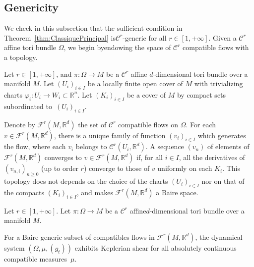 \documentclass[10pt]{amsart}
\theoremstyle{definition}\newtheorem{defi}[theo]{Definition}\newtheorem{rema}[theo]{Remark}\newtheorem{exam}[theo]{Example}\newtheorem{exem}[theo]{Example}\newtheorem{nota}[theo]{Notation}
\newcommand{\R}{\mathbb{R}}
\newcommand{\Ccal}{\mathcal{C}}
\newcommand{\Fcal}{\mathcal{F}}
\begin{document}
\subsection{Genericity}\label{subsec:FlotTM}


We check in this subsection that the sufficient condition in Theorem~\ref{thm:ClassiquePrincipal} is\linebreak$\Ccal^r$-generic for all $r \in [1, +\infty]$. Given a $\Ccal^r$ affine tori bundle $\Omega$, we begin by\linebreak endowing the space of $\Ccal^r$ compatible flows with a topology.


Let $r \in [1, +\infty]$, and $\pi: \Omega \to M$ be a $\Ccal^r$ affine $d$-dimensional tori bundle over a manifold $M$. Let $(U_i)_{i \in I}$ be a locally finite open cover of $M$ with trivializing charts $\varphi_i : U_i \to W_i \subset \R^n$. Let $(K_i)_{i \in I}$ be a cover of $M$ by compact sets subordinated to~$(U_i)_{i \in I}$.


Denote by $\Fcal^r (M, \R^d)$ the set of $\Ccal^r$ compatible flows on $\Omega$. For each $v \in \Fcal^r (M, \R^d)$, there is a unique family of function $(v_i)_{i \in I}$ which generates the flow, where each $v_i$ belongs to $\Ccal^r (U_i,\R^d)$. A sequence $(v_n)$ of elements of $\Fcal^r (M, \R^d)$ converges to $v \in \Fcal^r (M, \R^d)$ if, for all $i \in I$, all the derivatives of $(v_{n,i})_{n \geq 0}$ (up to order $r$) converge to those of $v$ uniformly on each $K_i$. This topology does not depends on the choice of the charts $(U_i)_{i \in I}$ nor on that of the compacts $(K_i)_{i \in I}$, and makes $\Fcal^r (M, \R^d)$ a Baire space.


\begin{prop}\label{prop:BaireGenericite}

Let $r \in [1, +\infty]$. Let $\pi: \Omega \to M$ be a $\Ccal^r$ affine\linebreak$d$-dimensional tori bundle over a manifold $M$.


For a Baire generic subset of compatibles flows in $\Fcal^r (M, \R^d)$, the dynamical system $(\Omega, \mu, (g_t))$ exhibits Keplerian shear for all absolutely continuous compatible measures~$\mu$.
\end{prop}
\end{document}
